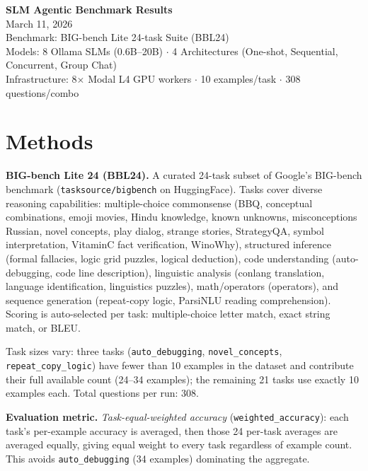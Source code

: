 \documentclass[11pt,letterpaper]{article}
\begin{document}
\begin{center}
{\LARGE \textbf{SLM Agentic Benchmark Results}}\\[4pt]
{\large March 11, 2026}\\[6pt]
{\small\textcolor{notegray}{Benchmark: BIG-bench Lite 24-task Suite (BBL24)}}\\[2pt]
{\small\textcolor{notegray}{Models: 8 Ollama SLMs (0.6B--20B) $\cdot$ 4 Architectures (One-shot, Sequential, Concurrent, Group Chat)}}\\[2pt]
{\small\textcolor{notegray}{Infrastructure: 8$\times$ Modal L4 GPU workers $\cdot$ 10 examples/task $\cdot$ 308 questions/combo}}
\end{center}

\vspace{0.3cm}

\section*{Methods}

\textbf{BIG-bench Lite 24 (BBL24).} A curated 24-task subset of Google's BIG-bench benchmark
(\texttt{tasksource/bigbench} on HuggingFace). Tasks cover diverse reasoning capabilities:
multiple-choice commonsense (BBQ, conceptual combinations, emoji movies, Hindu knowledge,
known unknowns, misconceptions Russian, novel concepts, play dialog, strange stories, StrategyQA,
symbol interpretation, VitaminC fact verification, WinoWhy), structured inference (formal
fallacies, logic grid puzzles, logical deduction), code understanding (auto-debugging, code line
description), linguistic analysis (conlang translation, language identification, linguistics
puzzles), math/operators (operators), and sequence generation (repeat-copy logic, ParsiNLU
reading comprehension). Scoring is auto-selected per task: multiple-choice letter match, exact
string match, or BLEU.

Task sizes vary: three tasks (\texttt{auto\_debugging}, \texttt{novel\_concepts},
\texttt{repeat\_copy\_logic}) have fewer than 10 examples in the dataset and contribute their
full available count (24--34 examples); the remaining 21 tasks use exactly 10 examples each.
Total questions per run: 308.

\textbf{Evaluation metric.} \emph{Task-equal-weighted accuracy} (\texttt{weighted\_accuracy}):
each task's per-example accuracy is averaged, then those 24 per-task averages are averaged
equally, giving equal weight to every task regardless of example count. This avoids
\texttt{auto\_debugging} (34 examples) dominating the aggregate.
\end{document}
